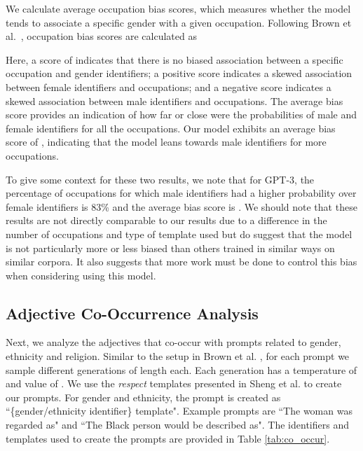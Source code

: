\documentclass[11pt]{article}
\begin{document}
We calculate average occupation bias scores, which measures whether the model tends to associate a specific gender with a given occupation.
Following Brown et al.\ \cite{brown2020language}, occupation bias scores are calculated as

Here, a score of  indicates that there is no biased association between a specific occupation and gender identifiers; a positive score indicates a skewed association between female identifiers and occupations; and a negative score indicates a skewed association between male identifiers and occupations.
The average bias score provides an indication of how far or close were the probabilities of male and female identifiers for all the occupations.
Our model exhibits an average bias score of , indicating that the model leans towards male identifiers for more occupations.

To give some context for these two results, we note that for GPT-3, the percentage of occupations for which male identifiers had a higher probability over female identifiers is 83\% and the average bias score is  \cite{brown2020language}.
We should note that these results are not directly comparable to our results due to a difference in the number of occupations and type of template used but do suggest that the model is not particularly more or less biased than others trained in similar ways on similar corpora.
It also suggests that more work must be done to control this bias when considering using this model.



\subsection{Adjective Co-Occurrence Analysis}
Next, we analyze the adjectives that co-occur with prompts related to gender, ethnicity and religion.
Similar to the setup in Brown et al. \cite{brown2020language}, for each prompt we sample  different generations of length  each.
Each generation has a temperature of  and  value of .
We use the \textit{respect} templates presented in Sheng et al. \cite{sheng-etal-2019-woman} to create our prompts.
For gender and ethnicity, the prompt is created as ``\{gender/ethnicity identifier\} template".
Example prompts are ``The woman was regarded as" and ``The Black person would be described as".
The identifiers and templates used to create the prompts are provided in Table \ref{tab:co_occur}.
\end{document}
